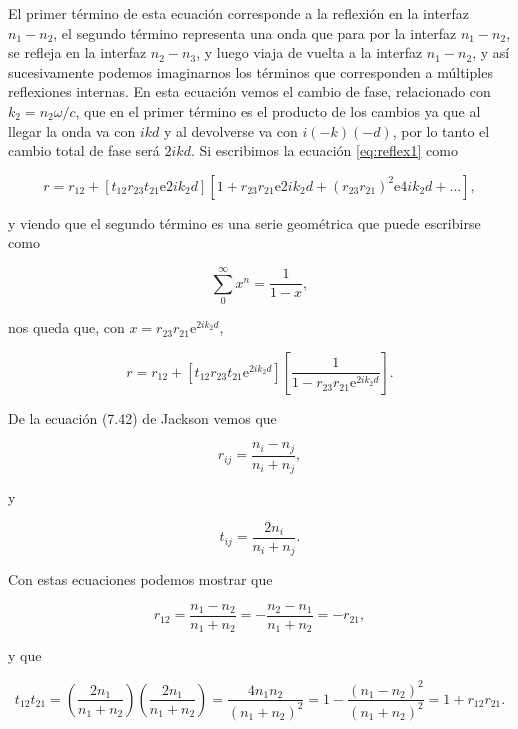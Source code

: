 \documentclass[a4paper,11pt]{article}
\numberwithin{equation}{section}
\newcommand{\euler}{\mathrm{e}}
\begin{document}
El primer término de esta ecuación corresponde a la reflexión en la interfaz 
$n_1-n_2$, el segundo término representa una onda que para por la interfaz 
$n_1-n_2$, se refleja en la interfaz $n_2-n_3$, y luego viaja de vuelta a la 
interfaz $n_1-n_2$, y así sucesivamente podemos imaginarnos los términos 
que corresponden a múltiples reflexiones internas. En esta ecuación vemos 
el cambio de fase, relacionado con $k_2 = n_2 \omega /c$, que en el primer 
término es el producto de los cambios ya que al llegar la onda va con $ikd$ y 
al devolverse va con $i(-k)(-d)$, por lo tanto el cambio total de fase será 
$2ikd$. Si escribimos la ecuación \eqref{eq:reflex1} como 

\begin{equation}
 r = r_{12} + [t_{12}r_{23}t_{21} \euler{2ik_2d}][1 + r_{23}r_{21}\euler{2ik_2d} 
 + (r_{23}r_{21})^2 \euler{4ik_2d} + \dots],
\end{equation}

y viendo que el segundo término es una serie geométrica que puede escribirse como 

\begin{equation}
 \sum_0^\infty x^n = \frac{1}{1-x},
\end{equation}

nos queda que, con $x = r_{23}r_{21}\euler^{2ik_2d}$,

\begin{equation}
 r = r_{12} + [t_{12}r_{23}t_{21} \euler^{2ik_2d}]\left[\frac{1}{1 - 
 r_{23}r_{21}\euler^{2ik_2d}} \right].
\end{equation}

De la ecuación (7.42) de Jackson \cite{jackson} vemos que 

\begin{equation}
 r_{ij} = \frac{n_i - n_j}{n_i + n_j},
\end{equation}

y 

\begin{equation}
 t_{ij} = \frac{2n_i}{n_i + n_j}.
\end{equation}

Con estas ecuaciones podemos mostrar que 

\begin{equation}
 r_{12} = \frac{n_1 - n_2}{n_1 + n_2} = - \frac{n_2 - n_1}{n_1 + n_2} = - r_{21},
\end{equation}

y que 

\begin{equation}
 t_{12}t_{21} = \left(\frac{2n_1}{n_1 + n_2} \right)\left(\frac{2n_1}{n_1 + n_2}\right) = 
 \frac{4 n_1 n_2}{(n_1 + n_2)^2} = 1 - \frac{(n_1 - n_2)^2}{(n_1 + n_2)^2} = 1 + r_{12}r_{21}.
\end{equation}
\end{document}

